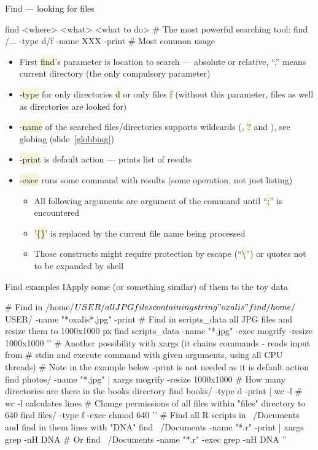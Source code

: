 \documentclass[compress, xelatex, 11pt, xcolor=svgnames, aspectratio=169, url={hyphens, lowtilde}]{beamer}
\renewcommand{\texttt}[1]{\colorbox{Beige}{{\ttfamily #1}}}
\begin{document}
\begin{frame}[fragile]{Find --- looking for files}
	\begin{bashcode}
    find <where> <what> <what to do> # The most powerful searching tool:
    find /... -type d/f -name XXX -print # Most common usage
	\end{bashcode}
	\begin{itemize}
		\item First \texttt{find}'s parameter is location to search --- absolute or relative, \enquote{\texttt{.}} means current directory (the only compulsory parameter)
		\item \texttt{-type} for only directories \texttt{d} or only files \texttt{f} (without this parameter, files as well as directories are looked for)
		\item \texttt{-name} of the searched files/directories supports wildcards (\texttt{*}, \texttt{?} and \texttt{[\ldots]}), see globing (slide~\ref{globbing})
		\item \texttt{-print} is default action --- prints list of results
		\item \texttt{-exec} runs some command with results (some operation, not just listing)
		\begin{itemize}
			\item All following arguments are argument of the command until \enquote{\texttt{;}} is encountered
			\item \texttt{'\{\}'} is replaced by the current file name being processed
			\item Those constructs might require protection by escape (\enquote{\texttt{\textbackslash}}) or quotes not to be expanded by shell
		\end{itemize}
	\end{itemize}
\end{frame}

\begin{frame}[fragile]{Find examples I}{Apply some (or something similar) of them to the toy data}
	\begin{bashcode}
    # Find in /home/$USER/ all JPG files containing string "oxalis"
    find /home/$USER/ -name "*oxalis*.jpg" -print
    # Find in scripts_data all JPG files and resize them to 1000x1000 px
    find scripts_data -name "*.jpg" -exec mogrify -resize 1000x1000 '{}' \;
    # Another possibility with xargs (it chains commands - reads input from
    # stdin and execute command with given arguments, using all CPU threads)
    # Note in the example below -print is not needed as it is default action
    find photos/ -name "*.jpg" | xargs mogrify -resize 1000x1000
    # How many directories are there in the books directory
    find books/ -type d -print | wc -l # wc -l calculates lines
    # Change permissions of all files within "files" directory to 640
    find files/ -type f -exec chmod 640 '{}' \;
    # Find all R scripts in ~/Documents and find in them lines with "DNA"
    find ~/Documents -name "*.r" -print | xargs grep -nH DNA # Or
    find ~/Documents -name "*.r" -exec grep -nH DNA '{}' \;
	\end{bashcode}
\end{frame}
\end{document}
